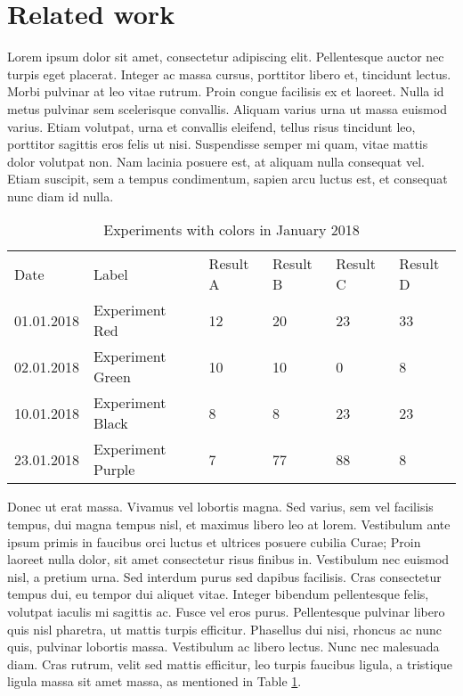 \section{Related work} \label{related-work}

Lorem ipsum dolor sit amet, consectetur adipiscing elit. Pellentesque auctor nec turpis eget placerat. Integer ac massa cursus, porttitor libero et, tincidunt lectus. Morbi pulvinar at leo vitae rutrum. Proin congue facilisis ex et laoreet. Nulla id metus pulvinar sem scelerisque convallis. Aliquam varius urna ut massa euismod varius. Etiam volutpat, urna et convallis eleifend, tellus risus tincidunt leo, porttitor sagittis eros felis ut nisi. Suspendisse semper mi quam, vitae mattis dolor volutpat non. Nam lacinia posuere est, at aliquam nulla consequat vel. Etiam suscipit, sem a tempus condimentum, sapien arcu luctus est, et consequat nunc diam id nulla.

\begin{table}[h]
\begin{tabular}{llllll}
Date       & Label             & Result A & Result B & Result C & Result D \\
01.01.2018 & Experiment Red    & 12       & 20       & 23       & 33       \\
02.01.2018 & Experiment Green  & 10       & 10       & 0        & 8        \\
10.01.2018 & Experiment Black  & 8        & 8        & 23       & 23       \\
23.01.2018 & Experiment Purple & 7        & 77       & 88       & 8       
\end{tabular}
\caption{Experiments with colors in January 2018}
\label{tab:color-experiments}   
\end{table}

Donec ut erat massa. Vivamus vel lobortis magna. Sed varius, sem vel facilisis tempus, dui magna tempus nisl, et maximus libero leo at lorem. Vestibulum ante ipsum primis in faucibus orci luctus et ultrices posuere cubilia Curae; Proin laoreet nulla dolor, sit amet consectetur risus finibus in. Vestibulum nec euismod nisl, a pretium urna. Sed interdum purus sed dapibus facilisis. Cras consectetur tempus dui, eu tempor dui aliquet vitae. Integer bibendum pellentesque felis, volutpat iaculis mi sagittis ac. Fusce vel eros purus. Pellentesque pulvinar libero quis nisl pharetra, ut mattis turpis efficitur. Phasellus dui nisi, rhoncus ac nunc quis, pulvinar lobortis massa. Vestibulum ac libero lectus. Nunc nec malesuada diam. Cras rutrum, velit sed mattis efficitur, leo turpis faucibus ligula, a tristique ligula massa sit amet massa, as mentioned in Table \ref{tab:color-experiments}.

